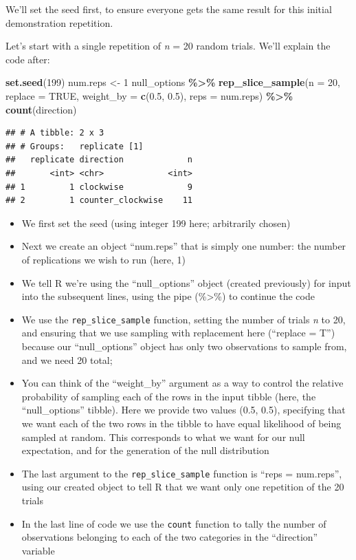 \documentclass[
]{book}
\newenvironment{Shaded}{\begin{snugshade}}{\end{snugshade}}
\newcommand{\AttributeTok}[1]{\textcolor[rgb]{0.13,0.29,0.53}{#1}}
\newcommand{\ConstantTok}[1]{\textcolor[rgb]{0.56,0.35,0.01}{#1}}
\newcommand{\DecValTok}[1]{\textcolor[rgb]{0.00,0.00,0.81}{#1}}
\newcommand{\FloatTok}[1]{\textcolor[rgb]{0.00,0.00,0.81}{#1}}
\newcommand{\FunctionTok}[1]{\textcolor[rgb]{0.13,0.29,0.53}{\textbf{#1}}}
\newcommand{\NormalTok}[1]{#1}
\newcommand{\OtherTok}[1]{\textcolor[rgb]{0.56,0.35,0.01}{#1}}
\newcommand{\SpecialCharTok}[1]{\textcolor[rgb]{0.81,0.36,0.00}{\textbf{#1}}}
\providecommand{\tightlist}{%
  \setlength{\itemsep}{0pt}\setlength{\parskip}{0pt}}
\begin{document}
We'll set the seed first, to ensure everyone gets the same result for this initial demonstration repetition.

Let's start with a single repetition of \emph{n} = 20 random trials. We'll explain the code after:

\begin{Shaded}
\begin{Highlighting}[]
\FunctionTok{set.seed}\NormalTok{(}\DecValTok{199}\NormalTok{)}
\NormalTok{num.reps }\OtherTok{\textless{}{-}} \DecValTok{1}
\NormalTok{null\_options }\SpecialCharTok{\%\textgreater{}\%}
  \FunctionTok{rep\_slice\_sample}\NormalTok{(}\AttributeTok{n =} \DecValTok{20}\NormalTok{, }\AttributeTok{replace =} \ConstantTok{TRUE}\NormalTok{, }\AttributeTok{weight\_by =} \FunctionTok{c}\NormalTok{(}\FloatTok{0.5}\NormalTok{, }\FloatTok{0.5}\NormalTok{), }\AttributeTok{reps =}\NormalTok{ num.reps) }\SpecialCharTok{\%\textgreater{}\%}
  \FunctionTok{count}\NormalTok{(direction)}
\end{Highlighting}
\end{Shaded}

\begin{verbatim}
## # A tibble: 2 x 3
## # Groups:   replicate [1]
##   replicate direction             n
##       <int> <chr>             <int>
## 1         1 clockwise             9
## 2         1 counter_clockwise    11
\end{verbatim}

\begin{itemize}
\tightlist
\item
  We first set the seed (using integer 199 here; arbitrarily chosen)
\item
  Next we create an object ``num.reps'' that is simply one number: the number of replications we wish to run (here, 1)
\item
  We tell R we're using the ``null\_options'' object (created previously) for input into the subsequent lines, using the pipe (\%\textgreater\%) to continue the code
\item
  We use the \texttt{rep\_slice\_sample} function, setting the number of trials \emph{n} to 20, and ensuring that we use sampling with replacement here (``replace = T'') because our ``null\_options'' object has only two observations to sample from, and we need 20 total;
\item
  You can think of the ``weight\_by'' argument as a way to control the relative probability of sampling each of the rows in the input tibble (here, the ``null\_options'' tibble). Here we provide two values (0.5, 0.5), specifying that we want each of the two rows in the tibble to have equal likelihood of being sampled at random. This corresponds to what we want for our null expectation, and for the generation of the null distribution
\item
  The last argument to the \texttt{rep\_slice\_sample} function is ``reps = num.reps'', using our created object to tell R that we want only one repetition of the 20 trials
\item
  In the last line of code we use the \texttt{count} function to tally the number of observations belonging to each of the two categories in the ``direction'' variable
\end{itemize}
\end{document}

